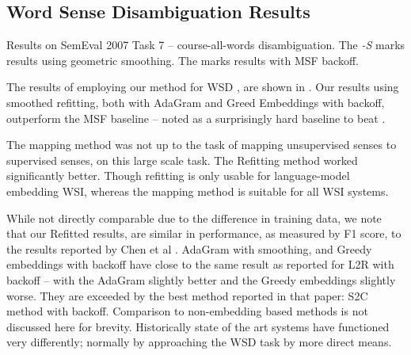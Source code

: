 \documentclass{article}
\def\parencite{\cite}
\begin{document}
\subsection{Word Sense Disambiguation Results} \label{WSDtask}
\begin{table}
	\begin{adjustbox}{max width=\columnwidth}
	\end{adjustbox}

	\caption{Results on SemEval 2007 Task 7 -- course-all-words disambiguation.
	The \emph{-S} marks results using geometric smoothing.
	The \emph{\textasteriskcentered } marks results with MSF backoff.
	} \label{samevalres}
\end{table}

The results of employing our method for WSD , are shown in .
Our results using smoothed refitting, both with AdaGram and Greed Embeddings with backoff, outperform the MSF baseline -- noted as a surprisingly hard baseline to beat \parencite{Chen2014}.

The mapping method \parencite{agirre2006}  was not up to the task of mapping unsupervised senses to supervised senses, on this large scale task.
The Refitting method worked significantly better.
Though refitting is only usable for language-model embedding WSI, whereas the mapping method is suitable for all WSI systems.

While not directly comparable due to the difference in training data, we note that our Refitted results, are similar in performance, as measured by F1 score, to the results reported by Chen et al .
AdaGram with smoothing, and Greedy embeddings with backoff have close to the same result as reported for L2R with backoff -- with the AdaGram slightly better and the Greedy embeddings slightly worse.
They are exceeded by the best method reported in that paper: S2C method with backoff.
Comparison to non-embedding based methods is not discussed here for brevity.
Historically state of the art systems have functioned very differently; normally by approaching the WSD task by more direct means. %
\end{document}
